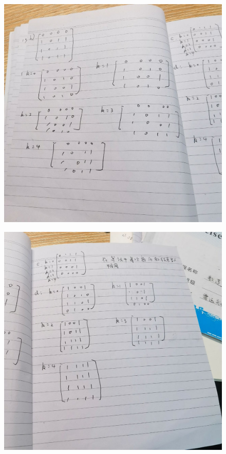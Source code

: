 \documentclass{article}
\begin{document}
    \begin{figure}[H]
    \centering
    \includegraphics[width=1\textwidth]{hw9/IMG_20221205_183716.jpg}
    \caption{\label{Lab9}}
    \end{figure}

    \begin{figure}[H]
    \centering
    \includegraphics[width=1\textwidth]{hw9/IMG_20221205_183718.jpg}
    \caption{\label{Lab9}}
    \end{figure}
        
\end{document}
